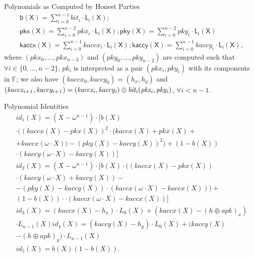 \noindent \textsf{Polynomials as Computed by Honest Parties} 
\vspace{-0.1cm}
\begin{align*}
&\mathsf{b(X)} = \sum_{i=0}^{n-1} \mathit{bit_i} \cdot \mathsf{L_i(X)}; \\ 
& \mathsf{pkx(X)} =  \sum_{i=0}^{n-2} \mathit{pkx_i} \cdot \mathsf{L_i(X)}; \mathsf{pky(X)} =  \sum_{i=0}^{n-2} \mathit{pky_i} \cdot \mathsf{L_i(X)} \\
&\mathsf{kaccx(X)}  =  \sum_{i=0}^{n-1} \mathit{kaccx_i} \cdot \mathsf{L_i(X)}; \mathsf{kaccy(X)}  = \sum_{i=0}^{n-1} \mathit{kaccy_i} \cdot \mathsf{L_i(X)}, 
\end{align*}
\noindent where $(\mathit{pkx_0}, \ldots, \mathit{pkx_{n-2}})$ 
and $(\mathit{pky_0}, \ldots, \mathit{pky_{n-2}})$ are computed such that $\forall i \in \{0, \ldots, n-2\}$, $\mathit{pk_i}$ 
is interpreted as a pair $(\mathit{pkx_i}, \mathit{pky_i})$ with its components in $\mathbb{F}$; we also have 
$(\mathit{kaccx_{0}}, \mathit{kaccy_{0}}) = (\mathit{h_x}, \mathit{h_y})$ and 
$(\mathit{kaccx_{i+1}}, \mathit{kaccy_{i+1}}) = \\ (\mathit{kaccx_{i}}, \mathit{kaccy_{i}}) \oplus \mathit{bit_i}(\mathit{pkx_{i}}, \mathit{pky_{i}})$, 
$\forall i < n-1$. %
\\
\vspace{-0.15in}

\noindent \textsf{Polynomial Identities} 
\begin{align*}
& id_1(X) = (X-\omega^{n-1}) \cdot [b(X) \\ &\cdot ((kaccx(X)-pkx(X))^2 \cdot (kaccx(X)+ pkx(X) + \\ 
& + kaccx(\omega\cdot X)) - (pky(X) - kaccy(X))^2) +  (1-b(X))\\& \cdot (kaccy(\omega\cdot X) - kaccy(X))] \\
& id_2(X)  =  (X-\omega^{n-1})\cdot [b(X) \cdot ((kaccx(X) - pkx(X)) \\& \cdot (kaccy(\omega \cdot X) + kaccy(X)) - \\
& - (pky(X) - kaccy(X)) \cdot (kaccx(\omega \cdot X) - kaccx(X))) + \\& (1-b(X)) \cdot   \cdot(kaccx(\omega \cdot X) - kaccx(X))] \\
& id_3(X)  =  (kaccx(X) - h_x)\cdot L_0(X) + (kaccx(X) - (h\oplus apk)_{x}) \\ & \cdot L_{n-1}(X)  
 id_4(X) =  (kaccy(X) - h_y)\cdot L_0(X) + (kaccy(X) \\ & - (h\oplus apk)_{y}) \cdot L_{n-1}(X) \\
& id_5(X) =  b(X)(1-b(X)).
\end{align*}

